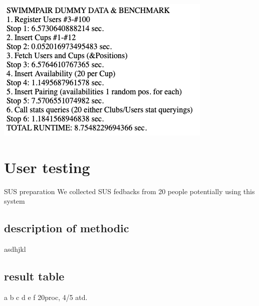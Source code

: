 \includegraphics[scale=0.707]{img/app-benchmarking.png}
\section{User testing}
SUS preparation  
We collected SUS fedbacks from 20 people potentially using this system  
\subsection{description of methodic}
asdhjkl
\subsection{result table}
a b c d e f 20proc, 4/5 atd.
